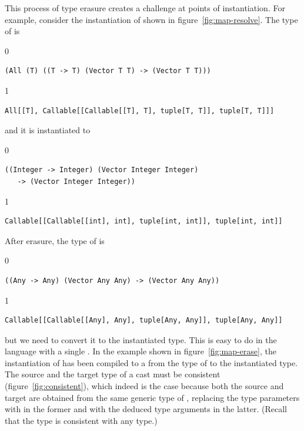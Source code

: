\documentclass[7x10]{TimesAPriori_MIT}%
\def\racketEd{0}
\def\pythonEd{1}
\providecommand{\BookEdition}{1}
\let\edition\BookEdition
\newcommand{\pythonColor}[0]{}
\numberwithin{theorem}{chapter}
\numberwithin{definition}{chapter}
\numberwithin{equation}{chapter}
\begin{document}
This process of type erasure creates a challenge at points of
instantiation. For example, consider the instantiation of
 shown in figure~\ref{fig:map-resolve}.
The type of  is
%
{\if\edition\racketEd    
\begin{lstlisting}
(All (T) ((T -> T) (Vector T T) -> (Vector T T)))
\end{lstlisting}
\fi}
{\if\edition\pythonEd\pythonColor    
\begin{lstlisting}
All[[T], Callable[[Callable[[T], T], tuple[T, T]], tuple[T, T]]]
\end{lstlisting}
\fi}
%
\noindent and it is instantiated to 
%
{\if\edition\racketEd
\begin{lstlisting}
((Integer -> Integer) (Vector Integer Integer)
   -> (Vector Integer Integer))
\end{lstlisting}
\fi}
{\if\edition\pythonEd\pythonColor
\begin{lstlisting}
Callable[[Callable[[int], int], tuple[int, int]], tuple[int, int]]
\end{lstlisting}
\fi}
%
\noindent After erasure, the type of  is
%
{\if\edition\racketEd
\begin{lstlisting}
((Any -> Any) (Vector Any Any) -> (Vector Any Any))
\end{lstlisting}
\fi}
{\if\edition\pythonEd\pythonColor
\begin{lstlisting}
Callable[[Callable[[Any], Any], tuple[Any, Any]], tuple[Any, Any]]
\end{lstlisting}
\fi}
%
\noindent but we need to convert it to the instantiated type.  This is
easy to do in the language \LangCast{} with a single .  In
the example shown in figure~\ref{fig:map-erase}, the instantiation of
 has been compiled to a  from the type of
 to the instantiated type. The source and the target type of
a cast must be consistent (figure~\ref{fig:consistent}), which indeed
is the case because both the source and target are obtained from the
same generic type of , replacing the type parameters with
\CANYTY{} in the former and with the deduced type arguments in the
latter. (Recall that the \CANYTY{} type is consistent with any type.)
\end{document}
